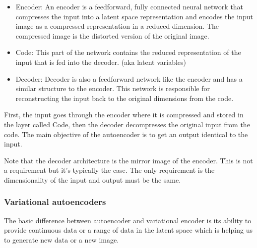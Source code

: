 \begin{itemize}
	\item Encoder: An encoder is a feedforward, fully connected neural network that compresses the input into a latent space representation and encodes the input image as a compressed representation in a reduced dimension. The compressed image is the distorted version of the original image.
	\item Code: This part of the network contains the reduced representation of the input that is fed into the decoder. (aka latent variables)
	\item Decoder: Decoder is also a feedforward network like the encoder and has a similar structure to the encoder. This network is responsible for reconstructing the input back to the original dimensions from the code.
\end{itemize}

First, the input goes through the encoder where it is compressed and stored in the layer called Code, then the decoder decompresses the original input from the code. The main objective of the autoencoder is to get an output identical to the input.

Note that the decoder architecture is the mirror image of the encoder. This is not a requirement but it’s typically the case. The only requirement is the dimensionality of the input and output must be the same.

\subsubsection{Variational autoencoders}




The basic difference between autoencoder and variational encoder is its ability to provide continuous data or a range of data in the latent space which is helping us to generate new data or a new image.

